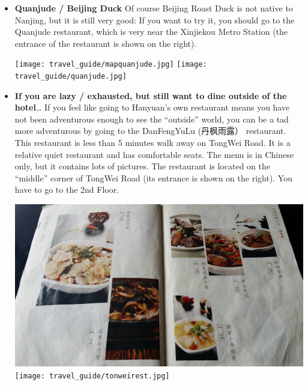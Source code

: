 \documentclass[11pt]{report}
\begin{document}
\begin{itemize}
\item\textbf{Quanjude / Beijing Duck}\hspace{3mm}
Of course Beijing Roast Duck is not native to Nanjing, but it
is still very good: If you want to try it, you should
go to the Quanjude restaurant, which is very near the Xinjiekou Metro
Station (the entrance of the restaurant is shown on the right).

\begin{center}
\texttt{[image: travel\_guide/mapquanjude.jpg]}
\hspace{5mm}
\texttt{[image: travel\_guide/quanjude.jpg]}
\end{center}

\item\textbf{If you are lazy / exhausted, but still want to 
dine outside of the hotel}\dots{}%
If you feel like going to Hanyuan's own restaurant means you
have not been adventurous enough to see the ``outside'' world,
you can be a tad more adventurous by going to the 
DanFengYuLu (丹枫雨露）
restaurant. This restaurant is less than 5 minutes walk away 
on TongWei Road. It is a relative quiet restaurant
and has comfortable seats. The menu is in Chinese only, but it
contains lots of pictures. The restaurant is
located on the ``middle'' corner of TongWei Road (its entrance
is shown on the right). You have to go to the 2nd Floor.

\begin{center}
\includegraphics[scale=0.15]{travel_guide/menu.jpg}
\hspace{5mm}
\texttt{[image: travel\_guide/tonweirest.jpg]}


\end{center}
\end{itemize}
\end{document}

